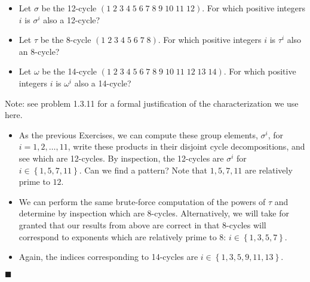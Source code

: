\documentclass[12pt]{article}
\renewcommand{\qed}{\hfill$\blacksquare$}
\renewenvironment{proof}{\begin{addmargin}[1em]{0em}\begin{newproof}}{\end{newproof}\end{addmargin}\qed}
\newenvironment{problem}[2][Exercise]{\begin{trivlist}
\item[\hskip \labelsep {\bfseries #1}\hskip \labelsep {\bfseries #2.}]}{\end{trivlist}}
\begin{document}
\begin{problem}{1.3.9}
\begin{itemize}
    \item Let $\sigma$ be the 12-cycle $\left(1\;2\;3\;4\;5\;6\;7\;8\;9\;10\;11\;12\right)$. For which positive integers $i$ is $\sigma^i$ also a 12-cycle?
    \item Let $\tau$ be the 8-cycle $\left(1\;2\;3\;4\;5\;6\;7\;8\right)$. For which positive integers $i$ is $\tau^i$ also an $8$-cycle?
    \item Let $\omega$ be the 14-cycle $\left(1\;2\;3\;4\;5\;6\;7\;8\;9\;10\;11\;12\;13\;14\right)$. For which positive integers $i$ is $\omega^i$ also a 14-cycle?
\end{itemize}
\end{problem}
\begin{proof}
Note: see problem 1.3.11 for a formal justification of the characterization we use here.
\begin{itemize}
    \item As the previous Exercises, we can compute these group elements, $\sigma^i$, for $i=1,2,\ldots,11$, write these products in their disjoint cycle decompositions, and see which are 12-cycles. By inspection, the 12-cycles are $\sigma^i$ for $i\in \left\{1,5,7,11\right\}$. Can we find a pattern? Note that $1,5,7,11$ are relatively prime to $12$.
    \item We can perform the same brute-force computation of the powers of $\tau$ and determine by inspection which are 8-cycles. Alternatively, we will take for granted that our results from above are correct in that 8-cycles will correspond to exponents which are relatively prime to 8: $i\in \left\{1,3,5,7\right\}$.
    \item Again, the indices corresponding to 14-cycles are $i\in \left\{1,3,5,9,11,13\right\}$.
\end{itemize}
\end{proof}
\end{document}

